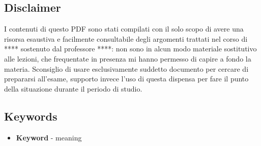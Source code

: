 \subsection{Disclaimer}
I contenuti di questo PDF sono stati compilati con il solo scopo di avere una 
risorsa esaustiva e facilmente consultabile degli argomenti trattati nel corso 
di **** sostenuto dal professore ****: non sono in 
alcun modo materiale sostitutivo alle lezioni, che frequentate in presenza mi 
hanno permesso di capire a fondo la materia. Sconsiglio di usare esclusivamente 
suddetto documento per cercare di prepararsi all'esame, supporto invece l'uso 
di questa dispensa per fare il punto della situazione durante il periodo 
di studio.
\subsection{Keywords}
\begin{itemize}
    \item \textbf{Keyword} - meaning
\end{itemize}
